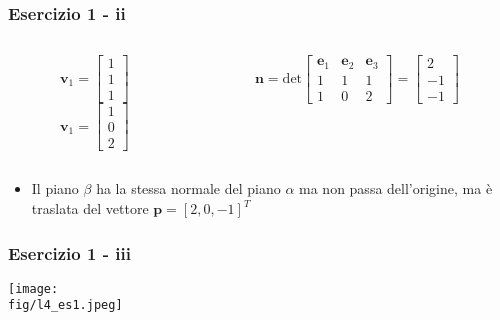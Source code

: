 \documentclass{beamer}
\newcommand{\fig}{./figures} %
\begin{document}
\begin{frame}
\frametitle{Esercizio  1 - ii}
\begin{columns}
\begin{column}{0.48\textwidth}
\begin{displaymath}
\mathbf{v}_1=
\begin{bmatrix}
1\\1\\1
\end{bmatrix}
\end{displaymath}
\begin{displaymath}
\mathbf{v}_1=
\begin{bmatrix}
1\\0\\2
\end{bmatrix}
\end{displaymath}
\end{column}
\begin{column}{0.48\textwidth}
\begin{displaymath}
\mathbf{n} =
\mbox{det}
\begin{bmatrix}
\mathbf{e}_1 & \mathbf{e}_2 & \mathbf{e}_3\\
1 & 1 & 1 \\
1 & 0 & 2
\end{bmatrix}
=
\begin{bmatrix}
2\\-1\\-1
\end{bmatrix}
\end{displaymath}
\end{column}
\end{columns}
\begin{itemize}
\item Il piano $\beta$ ha la stessa normale del piano $\alpha$ ma non passa dell'origine, ma \`e traslata del vettore $\mathbf{p}=[2,0,-1]^T$
\end{itemize}

\end{frame}
\begin{frame}
\frametitle{Esercizio 1 - iii}
\texttt{[image: \\fig/l4\_es1.jpeg]}
\end{frame}
\end{document}
